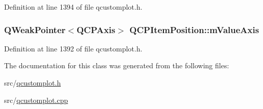 Definition at line 1394 of file qcustomplot.\-h.

\hypertarget{class_q_c_p_item_position_a65d7581f8030b93a42dd1386d24d0cd5}{
\subsubsection[{m\-Value\-Axis}]{\setlength{\rightskip}{0pt plus 5cm}Q\-Weak\-Pointer$<${\bf Q\-C\-P\-Axis}$>$ Q\-C\-P\-Item\-Position\-::m\-Value\-Axis\hspace{0.3cm}{\ttfamily [protected]}}}\label{class_q_c_p_item_position_a65d7581f8030b93a42dd1386d24d0cd5}


Definition at line 1392 of file qcustomplot.\-h.



The documentation for this class was generated from the following files\-:\begin{DoxyCompactItemize}
\item 
src/\hyperlink{qcustomplot_8h}{qcustomplot.\-h}\item 
src/\hyperlink{qcustomplot_8cpp}{qcustomplot.\-cpp}\end{DoxyCompactItemize}
